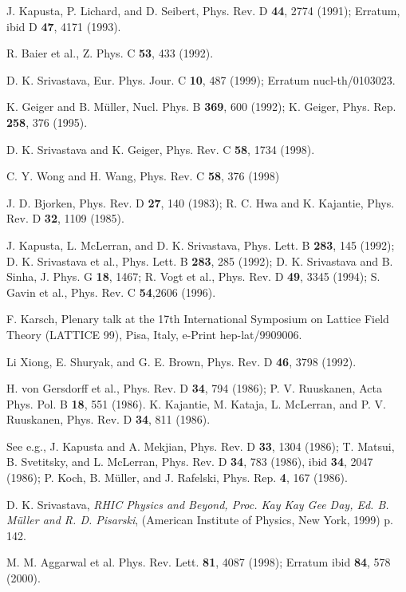 \begin{references}
 J. Kapusta, P. Lichard, and D. Seibert, Phys. Rev. D
{\bf 44}, 2774 (1991); Erratum, ibid D {\bf 47}, 4171 (1993).

 R. Baier et al., Z. Phys. C {\bf 53}, 433 (1992).

 D. K. Srivastava, Eur. Phys. Jour. C {\bf 10}, 487 (1999);
Erratum nucl-th/0103023.

 K. Geiger and B. M\"{u}ller, Nucl. Phys. B {\bf 369}, 600 (1992);
K. Geiger, Phys. Rep. {\bf 258}, 376 (1995).

 D. K. Srivastava and K. Geiger, Phys. Rev. C {\bf 58},
                  1734 (1998).

 C. Y. Wong and H. Wang, Phys.  Rev. C {\bf 58}, 376 (1998)

 J. D. Bjorken, Phys. Rev. D {\bf 27}, 140 (1983);
              R. C. Hwa and K. Kajantie, Phys. Rev. D {\bf 32}, 1109 (1985).

 J. Kapusta, L. McLerran, and D. K. Srivastava, Phys. Lett.
             B {\bf 283}, 145 (1992);
 D. K. Srivastava et al., Phys. Lett.  B {\bf 283}, 285 (1992);
 D. K. Srivastava and B. Sinha, J. Phys. G {\bf 18}, 1467;
 R. Vogt et al., Phys. Rev. D {\bf 49}, 3345 (1994); 
S. Gavin et al., Phys. Rev. C {\bf 54},2606 (1996).

 F. Karsch,  
Plenary talk at the 17th International Symposium on Lattice Field Theory
 (LATTICE 99), Pisa, Italy, e-Print  hep-lat/9909006.

 Li Xiong, E. Shuryak, and G. E. Brown, Phys. Rev. D
{\bf 46}, 3798 (1992).

 H. von Gersdorff et al., Phys. Rev. D {\bf 34}, 794 (1986);
 P. V. Ruuskanen, Acta Phys. Pol. B {\bf 18}, 551 (1986).
 K. Kajantie, M. Kataja, L. McLerran, and P. V. Ruuskanen, Phys. Rev. D
{\bf 34}, 811 (1986).

 See e.g., J. Kapusta and A. Mekjian, Phys. Rev. D {\bf 33},
                        1304 (1986);
T. Matsui, B. Svetitsky, and L. McLerran, Phys. Rev. D {\bf 34}, 783
(1986), ibid {\bf 34}, 2047 (1986);
P. Koch, B. M\"{u}ller, and J. Rafelski, Phys. Rep. {\bf 4}, 167
(1986).

 D. K. Srivastava, {\sl RHIC Physics and Beyond, Proc.
Kay Kay Gee Day, Ed. B. M\"{u}ller and R. D. Pisarski},
(American Institute of Physics, New York, 1999) p. 142.


 M. M. Aggarwal et al. Phys. Rev. Lett. {\bf 81},
4087 (1998); Erratum ibid {\bf 84}, 578 (2000).


\end{references}
